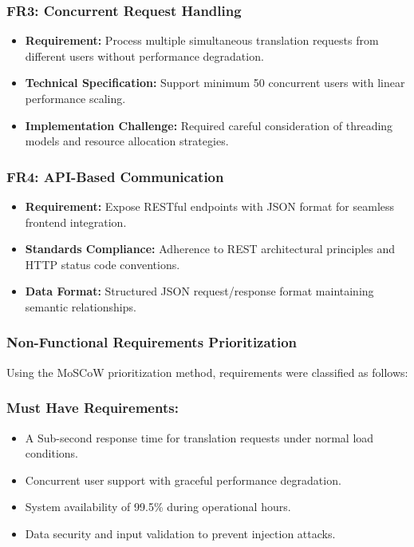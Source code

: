 \subsubsection{FR3: Concurrent Request Handling}
\begin{itemize}
    \item \textbf{Requirement:} Process multiple simultaneous translation requests from different users without
performance degradation.
\item \textbf{Technical Specification:} Support minimum 50 concurrent users with linear performance
scaling.
\item \textbf{Implementation Challenge:} Required careful consideration of threading models and resource
allocation strategies.
\end{itemize}

\subsubsection{FR4: API-Based Communication}
\begin{itemize}
    \item \textbf{Requirement:} Expose RESTful endpoints with JSON format for seamless frontend integration.
    \item \textbf{Standards Compliance:} Adherence to REST architectural principles and HTTP status code
conventions.
    \item \textbf{Data Format:} Structured JSON request/response format maintaining semantic relationships.
\end{itemize}

\subsubsection{Non-Functional Requirements Prioritization}

Using the MoSCoW prioritization method, requirements were classified as follows:

\subsubsection{Must Have Requirements:}
\begin{itemize}
    \item A Sub-second response time for translation requests under normal load conditions.
    \item Concurrent user support with graceful performance degradation.
    \item System availability of 99.5\% during operational hours.
    \item Data security and input validation to prevent injection attacks.
\end{itemize}

